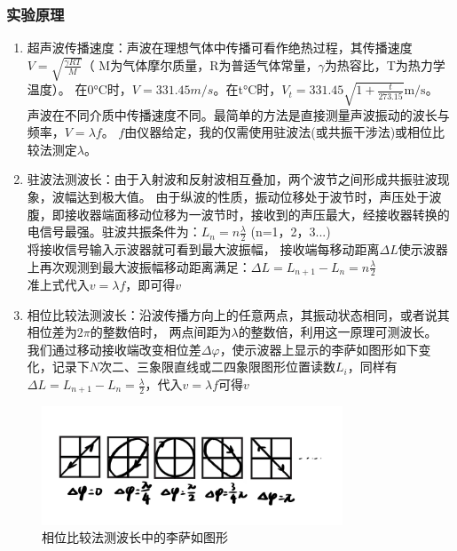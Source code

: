 \documentclass{Preport}
\begin{document}
\subsubsection{实验原理}
\begin{enumerate}
    \item 超声波传播速度：声波在理想气体中传播可看作绝热过程，其传播速度$V=\sqrt{\frac{\gamma RT}{M}}$（
    M为气体摩尔质量，R为普适气体常量，$\gamma$为热容比，T为热力学温度）。
    在0$\si{\degreeCelsius}$时，$V=331.45m/s$。在t$\si{\degreeCelsius}$时，$V_t = 331.45\sqrt{1+\frac{t}{273.15}}\si{\metre\per\second}$。
    声波在不同介质中传播速度不同。最简单的方法是直接测量声波振动的波长与频率，$V=\lambda f$。
    $f$由仪器给定，我的仅需使用驻波法(或共振干涉法)或相位比较法测定$\lambda$。
    \item 驻波法测波长：由于入射波和反射波相互叠加，两个波节之间形成共振驻波现象，波幅达到极大值。
    由于纵波的性质，振动位移处于波节时，声压处于波腹，即接收器端面移动位移为一波节时，接收到的声压最大，经接收器转换的电信号最强。驻波共振条件为：$L_n = n\frac{\lambda}{2}$ (n=1，2，3...)\\
    将接收信号输入示波器就可看到最大波振幅，
    接收端每移动距离$\Delta L$使示波器上再次观测到最大波振幅移动距离满足：$\Delta L = L_{n+1} - L_n = n\frac{\lambda}{2}$\\
    准上式代入$v=\lambda f$，即可得$v$
    \item 相位比较法测波长：沿波传播方向上的任意两点，其振动状态相同，或者说其相位差为$2\pi$的整数倍时，
    两点间距为$\lambda$的整数倍，利用这一原理可测波长。
    我们通过移动接收端改变相位差$\Delta\varphi$，使示波器上显示的李萨如图形如下变化，记录下$N$次二、三象限直线或二四象限图形位置读数$L_i$，同样有$\Delta L = L_{n+1} - L_n = \frac{\lambda}{2}$，代入$v=\lambda f$可得$v$
\end{enumerate}
\begin{figure}[H]
    \centering
    \includegraphics[width=0.8\textwidth]{figures/1.jpg}
    \caption{相位比较法测波长中的李萨如图形}
\end{figure}
\end{document}

